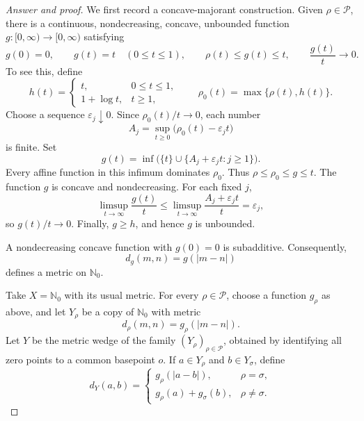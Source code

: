 \documentclass[11pt,reqno]{amsart}
\theoremstyle{plain}
\theoremstyle{definition}
\begin{document}
\begin{proof}[Answer and proof]
We first record a concave-majorant construction. Given $\rho\in\mathcal P$, there is a continuous, nondecreasing, concave, unbounded function $g\colon[0,\infty)\to[0,\infty)$ satisfying
\begin{equation*}
 g(0)=0,
 \qquad g(t)=t\quad(0\leq t\leq1),
 \qquad \rho(t)\leq g(t)\leq t,
 \qquad \frac{g(t)}t\longrightarrow0.
\end{equation*}
To see this, define
\begin{equation*}
 h(t)=
 \begin{cases}
 t, & 0\leq t\leq1,\\
 1+\log t, & t\geq1,
 \end{cases}
 \qquad
 \rho_0(t)=\max\{\rho(t),h(t)\}.
\end{equation*}
Choose a sequence $\varepsilon_j\downarrow0$. Since $\rho_0(t)/t\to0$, each number
\begin{equation*}
 A_j=\sup_{t\geq0}\bigl(\rho_0(t)-\varepsilon_jt\bigr)
\end{equation*}
is finite. Set
\begin{equation*}
 g(t)=\inf\bigl(\{t\}\cup
       \{A_j+\varepsilon_jt:j\geq1\}\bigr).
\end{equation*}
Every affine function in this infimum dominates $\rho_0$. Thus $\rho\leq\rho_0\leq g\leq t$. The function $g$ is concave and nondecreasing. For each fixed $j$,
\begin{equation*}
 \limsup_{t\to\infty}\frac{g(t)}t
 \leq \limsup_{t\to\infty}\frac{A_j+\varepsilon_jt}{t}
 =\varepsilon_j,
\end{equation*}
so $g(t)/t\to0$. Finally, $g\geq h$, and hence $g$ is unbounded.

A nondecreasing concave function with $g(0)=0$ is subadditive. Consequently,
\begin{equation*}
 d_g(m,n)=g(|m-n|)
\end{equation*}
defines a metric on $\mathbb N_0$.

Take $X=\mathbb N_0$ with its usual metric. For every $\rho\in\mathcal P$, choose a function $g_\rho$ as above, and let $Y_\rho$ be a copy of $\mathbb N_0$ with metric
\begin{equation*}
 d_\rho(m,n)=g_\rho(|m-n|).
\end{equation*}
Let $Y$ be the metric wedge of the family $(Y_\rho)_{\rho\in\mathcal P}$, obtained by identifying all zero points to a common basepoint $o$. If $a\in Y_\rho$ and $b\in Y_\sigma$, define
\begin{equation*}
 d_Y(a,b)=
 \begin{cases}
 g_\rho(|a-b|), & \rho=\sigma,\\[1mm]
 g_\rho(a)+g_\sigma(b), & \rho\neq\sigma.
 \end{cases}
\end{equation*}


\end{proof}
\end{document}
